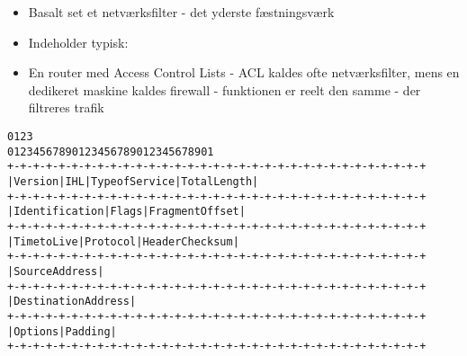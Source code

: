 \documentclass[Screen16to9,17pt]{foils}
\begin{document}

\begin{itemize}
\item Basalt set et netværksfilter - det yderste fæstningsværk
\item Indeholder typisk:
\item En router med Access Control Lists - ACL kaldes ofte
  netværksfilter, mens en dedikeret maskine kaldes firewall -
  funktionen er reelt den samme - der filtreres trafik
\end{itemize}



\begin{alltt}
\small
0                   1                   2                   3
0 1 2 3 4 5 6 7 8 9 0 1 2 3 4 5 6 7 8 9 0 1 2 3 4 5 6 7 8 9 0 1
+-+-+-+-+-+-+-+-+-+-+-+-+-+-+-+-+-+-+-+-+-+-+-+-+-+-+-+-+-+-+-+-+
|Version|  IHL  |Type of Service|          Total Length         |
+-+-+-+-+-+-+-+-+-+-+-+-+-+-+-+-+-+-+-+-+-+-+-+-+-+-+-+-+-+-+-+-+
|         Identification        |Flags|      Fragment Offset    |
+-+-+-+-+-+-+-+-+-+-+-+-+-+-+-+-+-+-+-+-+-+-+-+-+-+-+-+-+-+-+-+-+
|  Time to Live |    Protocol   |         Header Checksum       |
+-+-+-+-+-+-+-+-+-+-+-+-+-+-+-+-+-+-+-+-+-+-+-+-+-+-+-+-+-+-+-+-+
|                       Source Address                          |
+-+-+-+-+-+-+-+-+-+-+-+-+-+-+-+-+-+-+-+-+-+-+-+-+-+-+-+-+-+-+-+-+
|                    Destination Address                        |
+-+-+-+-+-+-+-+-+-+-+-+-+-+-+-+-+-+-+-+-+-+-+-+-+-+-+-+-+-+-+-+-+
|                    Options                    |    Padding    |
+-+-+-+-+-+-+-+-+-+-+-+-+-+-+-+-+-+-+-+-+-+-+-+-+-+-+-+-+-+-+-+-+
\end{alltt}
\end{document}
